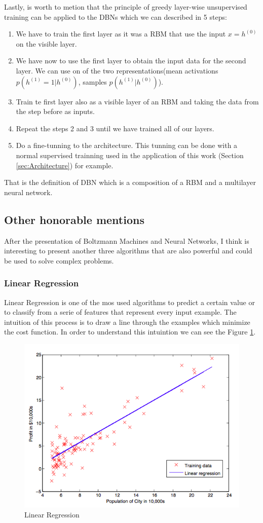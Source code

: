 \documentclass[12pt]{article}
\begin{document}
Lastly, is worth to metion that the principle of greedy layer-wise unsupervised training\cite{bengio2007greedy} can be applied to the DBNs which we can described in 5 steps:
\begin{enumerate}
\item We have to train the first layer as it was a RBM that use the input $x=h^{(0)}$ on the visible layer.
\item We have now to use the first layer to obtain the input data for the second layer. We can use on of the two representations(mean activations $p(h^{(1)}=1|h^{(0)})$, samples $p(h^{(1)}|h^{(0)})$).
\item Train te first layer also as a visible layer of an RBM and taking the data from the step before as inputs.
\item Repeat the steps 2 and 3 until we have trained all of our layers.
\item Do a fine-tunning to the architecture. This tunning can be done with a normal supervised trainning used in the application of this work (Section \ref{sec:Architecture}) for example.
\end{enumerate}
That is the definition of DBN which is a composition of a RBM and a multilayer neural network.
\subsection{Other honorable mentions}
After the presentation of Boltzmann Machines and Neural Networks, I think is interesting to present another three algorithms that are also powerful and could be used to solve complex problems.

\subsubsection{Linear Regression}
Linear Regression is one of the mos used algorithms to predict a certain value or to classify from a serie of features that represent every input example. The intuition of this process is to draw a line through the examples which minimize the cost function. In order to understand this intuintion we can see the Figure \ref{fig:figure3}.

\begin{figure}[ht]
\centering
\includegraphics[width=.4\textwidth]{Regression.png}
\caption{Linear Regression}
\label{fig:figure3}
\end{figure}
\end{document}
